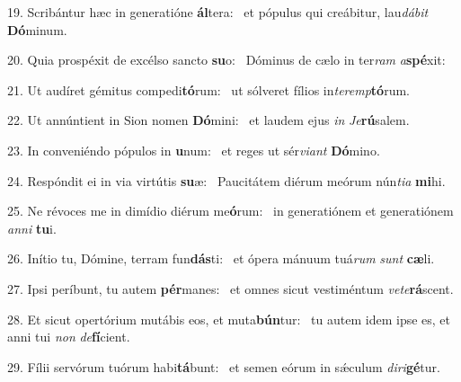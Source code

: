 19. Scribántur hæc in generatióne \textbf{ál}tera: \ast\  et pópulus qui creábitur, lau\textit{dá}\textit{bit} \textbf{Dó}minum.\

20. Quia prospéxit de excélso sancto \textbf{su}o: \ast\  Dóminus de cælo in ter\textit{ram} \textit{a}\textbf{spé}xit:\

21. Ut audíret gémitus compedi\textbf{tó}rum: \ast\  ut sólveret fílios in\textit{ter}\textit{emp}\textbf{tó}rum.\

22. Ut annúntient in Sion nomen \textbf{Dó}mini: \ast\  et laudem ejus \textit{in} \textit{Je}\textbf{rú}salem.\

23. In conveniéndo pópulos in \textbf{u}num: \ast\  et reges ut sér\textit{vi}\textit{ant} \textbf{Dó}mino.\

24. Respóndit ei in via virtútis \textbf{su}æ: \ast\  Paucitátem diérum meórum nún\textit{ti}\textit{a} \textbf{mi}hi.\

25. Ne révoces me in dimídio diérum me\textbf{ó}rum: \ast\  in generatiónem et generatiónem \textit{an}\textit{ni} \textbf{tu}i.\

26. Inítio tu, Dómine, terram fun\textbf{dás}ti: \ast\  et ópera mánuum tuá\textit{rum} \textit{sunt} \textbf{cæ}li.\

27. Ipsi períbunt, tu autem \textbf{pér}manes: \ast\  et omnes sicut vestiméntum \textit{ve}\textit{te}\textbf{rá}scent.\

28. Et sicut opertórium mutábis eos, et muta\textbf{bún}tur: \ast\  tu autem idem ipse es, et anni tui \textit{non} \textit{de}\textbf{fí}cient.\

29. Fílii servórum tuórum habi\textbf{tá}bunt: \ast\  et semen eórum in sǽculum \textit{di}\textit{ri}\textbf{gé}tur.\

